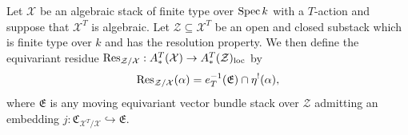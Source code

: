 \begin{definition}\label{rl-0014}\label{defn:residue-map}
  Let \(\mathcal X\) be an algebraic stack of finite type over \(\operatorname{Spec} k\) with a \(T\)-action and suppose that \(\mathcal X^T\) is algebraic. Let \(\mathcal Z\subseteq \mathcal X^T\) be an open and closed substack which is finite type over \(k\) and has the resolution property. We then define the equivariant residue \(\operatorname{Res}_{\mathcal Z/\mathcal X}:A^T_*(\mathcal X)\to A^T_*(\mathcal Z)_{\operatorname{loc}}\) by
  \begin{align*}
    \operatorname{Res}_{\mathcal Z/\mathcal X}(\alpha) = e^{-1}_T(\mathfrak E) \cap \eta^!(\alpha),
  \end{align*}
  where \(\mathfrak E\) is any moving equivariant vector bundle stack over \(\mathcal Z\) admitting an embedding \(j:\mathfrak C_{\mathcal X^T/\mathcal X}\hookrightarrow \mathfrak E\).
\end{definition}
